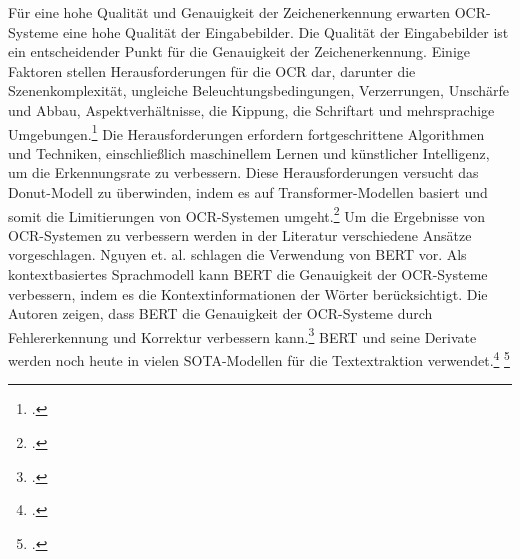 Für eine hohe Qualität und Genauigkeit der Zeichenerkennung erwarten OCR-Systeme eine hohe Qualität der Eingabebilder. Die Qualität der Eingabebilder ist ein entscheidender Punkt für die Genauigkeit der Zeichenerkennung. Einige Faktoren stellen Herausforderungen für die OCR dar, darunter die Szenenkomplexität, ungleiche Beleuchtungsbedingungen, Verzerrungen, Unschärfe und Abbau, Aspektverhältnisse, die Kippung, die Schriftart und mehrsprachige Umgebungen.\footcites[Vgl.][S.245]{hamad_detailed_2016} Die Herausforderungen erfordern fortgeschrittene Algorithmen und Techniken, einschließlich maschinellem Lernen und künstlicher Intelligenz, um die Erkennungsrate zu verbessern. Diese Herausforderungen versucht das Donut-Modell zu überwinden, indem es auf Transformer-Modellen basiert und somit die Limitierungen von OCR-Systemen umgeht.\footcites[Vgl.][S.1]{kim_ocr-free_2021} Um die Ergebnisse von OCR-Systemen zu verbessern werden in der Literatur verschiedene Ansätze vorgeschlagen. Nguyen et. al. schlagen die Verwendung von BERT vor. Als kontextbasiertes Sprachmodell kann BERT die Genauigkeit der OCR-Systeme verbessern, indem es die Kontextinformationen der Wörter berücksichtigt. Die Autoren zeigen, dass BERT die Genauigkeit der OCR-Systeme durch Fehlererkennung und Korrektur verbessern kann.\footcites[Vgl.][S.335 f.]{nguyen_neural_2020} BERT und seine Derivate werden noch heute in vielen \ac{SOTA}-Modellen für die Textextraktion verwendet.\footcites[Vgl. dazu ausführlich][S.4084 ff.]{huang_layoutlmv3_2022} \footcites[Vgl. dazu ausführlich][S.2 ff.]{garncarek_lambert_2020}

